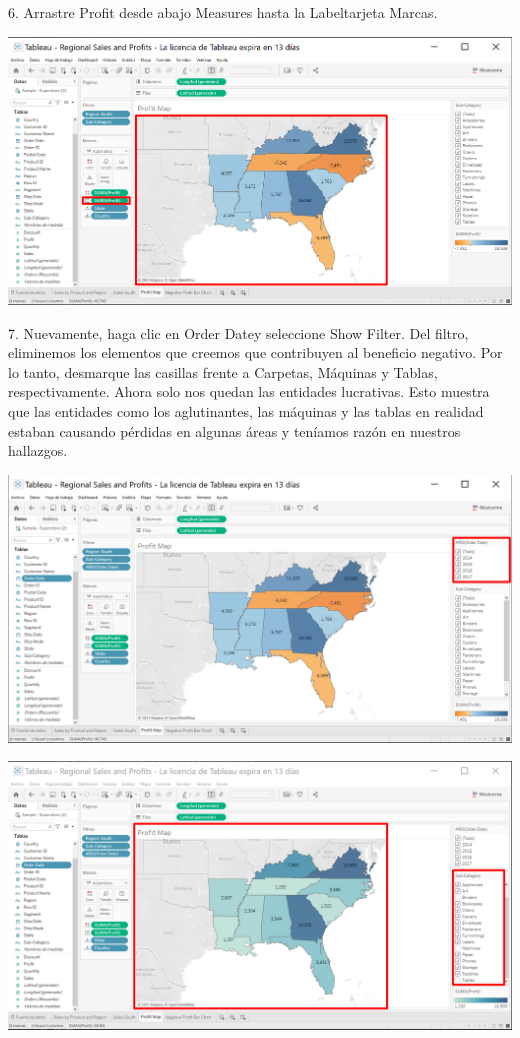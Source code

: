\documentclass[12pt,letterpaper]{article}
\begin{document}
6. Arrastre Profit desde abajo Measures hasta la Labeltarjeta Marcas.
\begin{center}
    \includegraphics[width=16cm]{img/43.png}  
\end{center}
7. Nuevamente, haga clic en Order Datey seleccione Show Filter. Del filtro, eliminemos los
elementos que creemos que contribuyen al beneficio negativo. Por lo tanto, desmarque las 
casillas frente a Carpetas, Máquinas y Tablas, respectivamente. Ahora solo nos quedan las
entidades lucrativas. Esto muestra que las entidades como los aglutinantes, las máquinas y las
tablas en realidad estaban causando pérdidas en algunas áreas y teníamos razón en nuestros
hallazgos.
\begin{center}
    \includegraphics[width=16cm]{img/44.png}  
\end{center}
\begin{center}
    \includegraphics[width=16cm]{img/45.png}  
\end{center}
\end{document}
